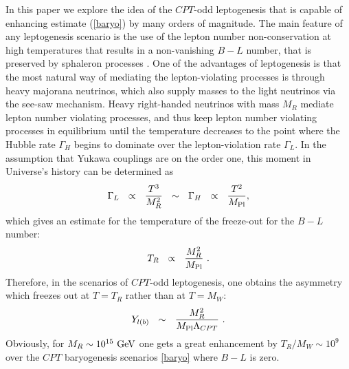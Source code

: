 \documentclass[12pt]{revtex4}
\newcommand{\Mpl}{M_{\rm Pl}}
\newcommand{\Tsph}{T_{\rm sph}}
\newcommand{\GeV}{{\rm GeV}}
\begin{document}
    In this paper we explore the idea of the $CPT$-odd leptogenesis that is capable of 
    enhancing estimate (\ref{baryo}) by many orders of magnitude. 
    The main feature of any leptogenesis scenario is the use of the lepton number non-conservation 
    at high temperatures that results in a non-vanishing $ B - L $ 
    number, that is preserved by sphaleron processes \cite{Fukugita:1986hr}. 
	One of the advantages of leptogenesis is that the most natural way of mediating
the lepton-violating processes is through
	heavy majorana neutrinos, which also supply masses to the light neutrinos
	via the see-saw mechanism. 
	Heavy right-handed neutrinos with mass $ M_R $ mediate lepton number violating processes, 
	and thus keep lepton number violating processes in equilibrium 
until the temperature decreases to the point where the Hubble rate $ \Gamma_H $ begins to dominate
over the lepton-violation rate $ \Gamma_L $.
	In the assumption that Yukawa couplings are on the order one, this moment in Universe's 
	history can be determined as 
\[
	\Gamma_L ~~\propto~~ \frac{T^3}{M_R^2} ~~\sim~~ \Gamma_H ~~\propto~~ \frac{T^2}{\Mpl},
\]
	which gives an estimate for the temperature of the freeze-out for the $B-L$ number:
\[
	T_R ~~\propto~~ \frac{M_R^2}{\Mpl}~.
\]
	Therefore, in the scenarios of $CPT$-odd leptogenesis, one obtains the asymmetry
	which freezes out at $ T = T_R $ rather than at $ T = M_W $:
\[
	Y_{l(b)} ~~\sim~~ \frac{M_R^2}{\Mpl\Lambda_{CPT}}~.
\]
	Obviously, for 	$ M_R \sim 10^{15}~\GeV $ one gets a great enhancement 
	by $ T_R/M_W \sim 10^{9}$ over the $CPT$ baryogenesis scenarios  \eqref{baryo} where 
$B-L$ is zero.
\end{document}
